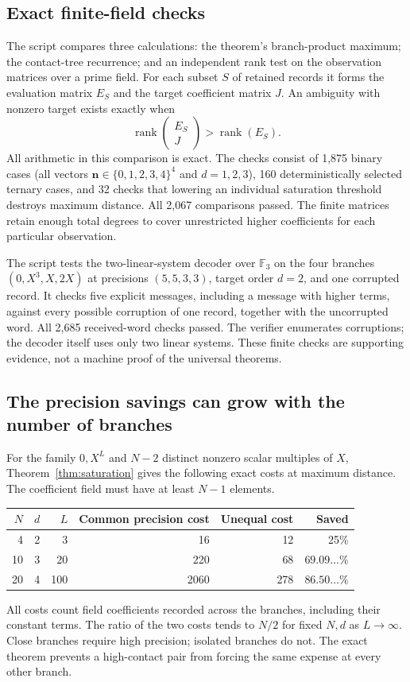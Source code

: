 \documentclass[11pt]{article}
\theoremstyle{definition}\newtheorem{definition}[theorem]{Definition}
\theoremstyle{remark}\newtheorem{remark}[theorem]{Remark}
\begin{document}
\subsection{Exact finite-field checks}

The script  compares three calculations:
the theorem's branch-product maximum; the contact-tree recurrence; and an
independent rank test on the observation matrices over a prime field.
For each subset $S$ of retained records it forms the evaluation matrix $E_S$
and the target coefficient matrix $J$. An ambiguity with nonzero target exists
exactly when
\[
 \operatorname{rank}\begin{pmatrix}E_S\\J\end{pmatrix}
 >\operatorname{rank}(E_S).
\]
All arithmetic in this comparison is exact. The checks consist of 1,875
binary cases (all vectors $\mathbf n\in\{0,1,2,3,4\}^4$ and $d=1,2,3$),
160 deterministically selected ternary cases, and 32 checks that lowering
an individual saturation threshold destroys maximum distance. All 2,067
comparisons passed. The finite matrices retain enough total degrees to
cover unrestricted higher coefficients for each particular observation.

The script  tests the two-linear-system decoder
over $\mathbb F_3$ on the four branches $(0,X^3,X,2X)$ at precisions
$(5,5,3,3)$, target order $d=2$, and one corrupted record. It checks five
explicit messages, including a message with higher terms, against every
possible corruption of one record, together with the uncorrupted word.
All 2,685 received-word checks passed. The verifier enumerates corruptions;
the decoder itself uses only two linear systems. These finite checks are
supporting evidence, not a machine proof of the universal theorems.

\subsection{The precision savings can grow with the number of branches}

For the family $0,X^L$ and $N-2$ distinct nonzero scalar multiples of $X$,
Theorem~\ref{thm:saturation} gives the following exact costs at maximum distance.
The coefficient field must have at least $N-1$ elements.
\begin{center}
\begin{tabular}{rrrrrr}
\toprule
$N$ & $d$ & $L$ & Common precision cost & Unequal cost & Saved\\
\midrule
4 & 2 & 3 & 16 & 12 & 25\%\\
10 & 3 & 20 & 220 & 68 & $69.09\ldots\%$\\
20 & 4 & 100 & 2060 & 278 & $86.50\ldots\%$\\
\bottomrule
\end{tabular}
\end{center}
All costs count field coefficients recorded across the branches, including
their constant terms. The ratio of the two costs tends to $N/2$ for fixed
$N,d$ as $L\to\infty$. Close branches require high precision; isolated
branches do not. The exact theorem prevents a high-contact pair from forcing
the same expense at every other branch.
\end{document}
